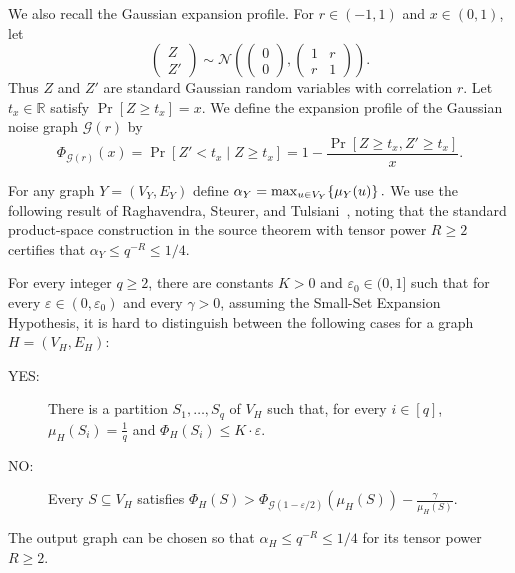 We also recall the Gaussian expansion profile. For $r\in(-1,1)$ and $x\in(0,1)$, let
\[
    \begin{pmatrix}Z\\Z'\end{pmatrix}
    \sim\mathcal{N}\left(
        \begin{pmatrix}0\\0\end{pmatrix},
        \begin{pmatrix}1&r\\r&1\end{pmatrix}
    \right).
\]
Thus $Z$ and $Z'$ are standard Gaussian random variables with correlation $r$. Let $t_x\in\mathbb{R}$ satisfy $\Pr[Z\geq t_x]=x$. We define the expansion profile of the Gaussian noise graph $\mathcal{G}(r)$ by
\[
    \Phi_{\mathcal{G}(r)}(x)
    =\Pr\left[Z'<t_x\mid Z\geq t_x\right]
    =1-\frac{\Pr[Z\geq t_x,Z'\geq t_x]}{x}.
\]

For any graph $Y=(V_Y,E_Y)$ define $
    \alpha_Y=\max_{u\in V_Y}\mathopen{}\left\{ \mu_Y(u) \right\}.
$
We use the following result of Raghavendra, Steurer, and Tulsiani~\cite{ReductionsBetweenExpansionProblems}, noting that the standard product-space construction in the source theorem with tensor power $R\geq2$ certifies that $\alpha_Y\leq q^{-R}\leq1/4$.

\begin{theorem}\label{thm:rst-global-expansion}
    For every integer $q\geq2$, there are constants $K>0$ and $\varepsilon_0\in(0,1]$ such that for every $\varepsilon\in(0,\varepsilon_0)$ and every $\gamma>0$, assuming the Small-Set Expansion Hypothesis, it is hard to distinguish between the following cases for a graph $H=(V_H,E_H)$:
    \begin{description}
        \item[YES:] There is a partition $S_1,\ldots,S_q$ of $V_H$ such that, for every $i\in[q]$, 
            $\mu_H(S_i)=\frac{1}{q}$ and $\Phi_H(S_i)\leq K\cdot\varepsilon$.
        \item[NO:] Every $S\subseteq V_H$ satisfies $
            \Phi_H(S)
            >
            \Phi_{\mathcal{G}(1-\varepsilon/2)}(\mu_H(S))
            -\frac{\gamma}{\mu_H(S)}$.
    \end{description}
    The output graph can be chosen so that $\alpha_H\leq q^{-R}\leq1/4$ for its tensor power $R\geq2$.
\end{theorem}

